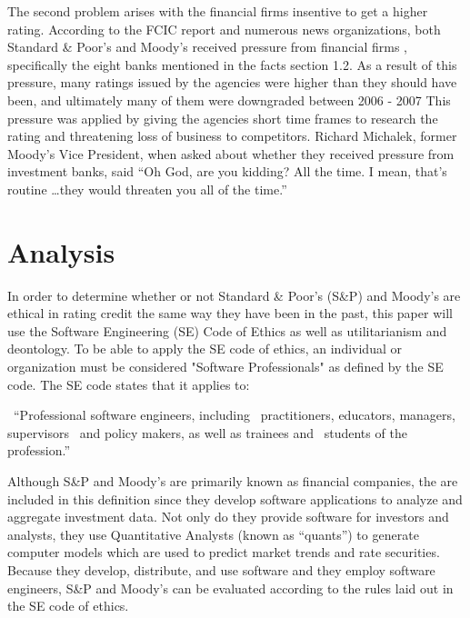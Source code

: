 \documentclass[11pt]{article}
\begin{document}
\begin{multicols}{2}
The second problem arises with the financial firms insentive to get a higher rating.  According to the FCIC report and numerous news organizations, both Standard \& Poor's and Moody's received pressure from financial firms \cite[p. xxv]{govtReport}, specifically the eight banks mentioned in the facts section 1.2.  As a result of this pressure, many ratings issued by the agencies were higher than they should have been, and ultimately many of them were downgraded between 2006 - 2007 \cite{ratingEthics, huffCreditCause}  This pressure was applied by giving the agencies short time frames to research the rating and threatening loss of business to competitors.  Richard Michalek, former Moody's Vice President, when asked about whether they received pressure from investment banks, said ``Oh God, are you kidding? All the time. I mean, that's routine \ldots they would threaten you all of the time.'' \cite[p. 210]{govtReport}



\section{Analysis}
In order to determine whether or not Standard \& Poor's (S\&P) and Moody's are ethical in rating credit the same way they have been in the past, this paper will use the Software Engineering (SE) Code of Ethics as well as utilitarianism and deontology.  To be able to apply the SE code of ethics, an individual or organization must be considered "Software Professionals" as defined by the SE code. The SE code states that it applies to:

\ ``Professional software engineers, including
\ practitioners, educators, managers, supervisors
\ and policy makers, as well as trainees and
\ students of the profession.''

Although S\&P and Moody's are primarily known as financial companies, the are included in this definition since they develop software applications to analyze and aggregate investment data. \cite{SnP, Moodys} Not only do they provide software for investors and analysts, they use Quantitative Analysts (known as ``quants'') to generate computer models which are used to predict market trends and rate securities. \cite{quantsRole, govtReport}  Because they develop, distribute, and use software and they employ software engineers, S\&P and Moody's can be evaluated according to the rules laid out in the SE code of ethics. 


\end{multicols}
\end{document}
